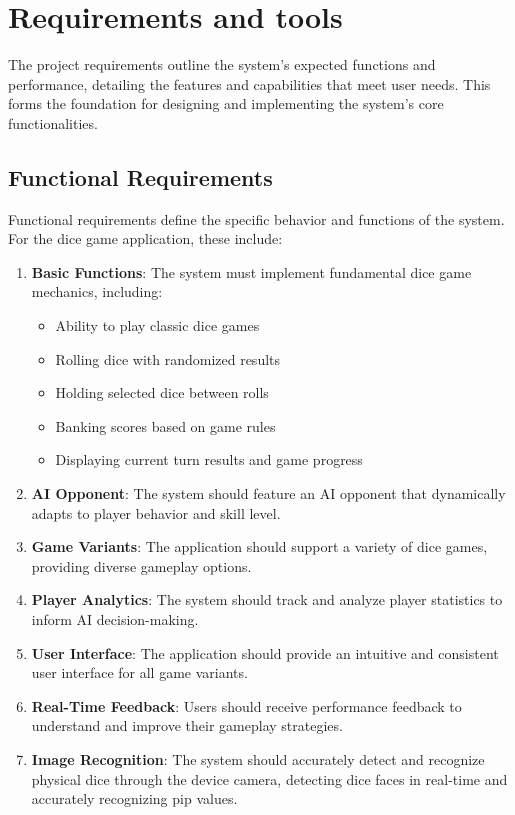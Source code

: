 
\chapter{Requirements and tools}
\label{chap:requirements-and-tools}

The project requirements outline the system's expected functions and performance, detailing the features and capabilities that meet user needs. This forms the foundation for designing and implementing the system's core functionalities.

\section{Functional Requirements}

Functional requirements define the specific behavior and functions of the system. For the dice game application, these include:

\begin{enumerate}
    \item {\bfseries Basic Functions}: The system must implement fundamental dice game mechanics, including:
    \begin{itemize}
        \item Ability to play classic dice games
        \item Rolling dice with randomized results
        \item Holding selected dice between rolls
        \item Banking scores based on game rules
        \item Displaying current turn results and game progress
    \end{itemize}
    \item {\bfseries AI Opponent}: The system should feature an AI opponent that dynamically adapts to player behavior and skill level.
    \item {\bfseries Game Variants}: The application should support a variety of dice games, providing diverse gameplay options.
    \item {\bfseries Player Analytics}: The system should track and analyze player statistics to inform AI decision-making.
    \item {\bfseries User Interface}: The application should provide an intuitive and consistent user interface for all game variants.
    \item {\bfseries Real-Time Feedback}: Users should receive performance feedback to understand and improve their gameplay strategies.
    \item {\bfseries Image Recognition}: The system should accurately detect and recognize physical dice through the device camera, detecting dice faces in real-time and accurately recognizing pip values.
\end{enumerate}

